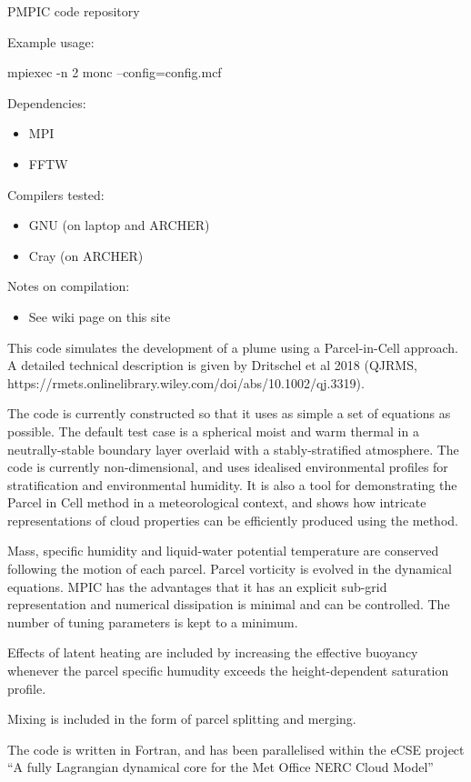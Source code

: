 \documentclass{beamer}
\providecommand{\tightlist}{%
  \setlength{\itemsep}{0pt}\setlength{\parskip}{0pt}}
\begin{document}
\begin{frame}{PMPIC code repository}
\protect\hypertarget{pmpic-code-repository}{}

Example usage:

mpiexec -n 2 monc --config=config.mcf

Dependencies:

\begin{itemize}
\tightlist
\item
  MPI
\item
  FFTW
\end{itemize}

Compilers tested:

\begin{itemize}
\tightlist
\item
  GNU (on laptop and ARCHER)
\item
  Cray (on ARCHER)
\end{itemize}

Notes on compilation:

\begin{itemize}
\tightlist
\item
  See wiki page on this site
\end{itemize}

This code simulates the development of a plume using a Parcel-in-Cell
approach. A detailed technical description is given by Dritschel et al
2018 (QJRMS,
https://rmets.onlinelibrary.wiley.com/doi/abs/10.1002/qj.3319).

The code is currently constructed so that it uses as simple a set of
equations as possible. The default test case is a spherical moist and
warm thermal in a neutrally-stable boundary layer overlaid with a
stably-stratified atmosphere. The code is currently non-dimensional, and
uses idealised environmental profiles for stratification and
environmental humidity. It is also a tool for demonstrating the Parcel
in Cell method in a meteorological context, and shows how intricate
representations of cloud properties can be efficiently produced using
the method.

Mass, specific humidity and liquid-water potential temperature are
conserved following the motion of each parcel. Parcel vorticity is
evolved in the dynamical equations. MPIC has the advantages that it has
an explicit sub-grid representation and numerical dissipation is minimal
and can be controlled. The number of tuning parameters is kept to a
minimum.

Effects of latent heating are included by increasing the effective
buoyancy whenever the parcel specific humudity exceeds the
height-dependent saturation profile.

Mixing is included in the form of parcel splitting and merging.

The code is written in Fortran, and has been parallelised within the
eCSE project ``A fully Lagrangian dynamical core for the Met Office NERC
Cloud Model''

\end{frame}
\end{document}
